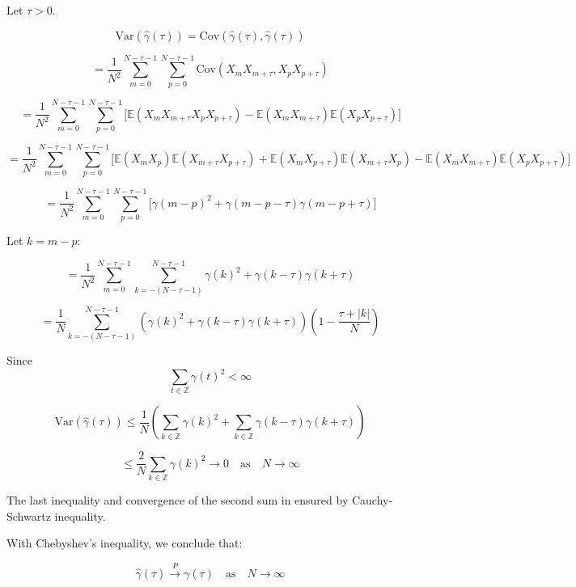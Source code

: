 \documentclass[11pt]{article}
\begin{document}
\begin{solution}

Let $\tau > 0$.

\[
\text{Var}(\hat{\gamma}(\tau)) = \text{Cov}(\hat{\gamma}(\tau), \hat{\gamma}(\tau))
\]

\[
= \frac{1}{N^2} \sum_{m=0}^{N-\tau-1} \sum_{p=0}^{N-\tau-1} \text{Cov}(X_m X_{m+\tau}, X_p X_{p+\tau})
\]

\[
= \frac{1}{N^2} \sum_{m=0}^{N-\tau-1} \sum_{p=0}^{N-\tau-1} \big[ \mathbb{E}(X_m X_{m+\tau} X_p X_{p+\tau}) - \mathbb{E}(X_m X_{m+\tau}) \mathbb{E}(X_p X_{p+\tau}) \big]
\]

\[
= \frac{1}{N^2} \sum_{m=0}^{N-\tau-1} \sum_{p=0}^{N-\tau-1} \big[ \mathbb{E}(X_m X_p) \mathbb{E}(X_{m+\tau} X_{p+\tau}) + \mathbb{E}(X_m X_{p+\tau}) \mathbb{E}(X_{m+\tau} X_p) - \mathbb{E}(X_m X_{m+\tau}) \mathbb{E}(X_p X_{p+\tau}) \big]
\]

\[
= \frac{1}{N^2} \sum_{m=0}^{N-\tau-1} \sum_{p=0}^{N-\tau-1} \big[ \gamma(m-p)^2 + \gamma(m-p-\tau)\gamma(m-p+\tau) \big]
\]

Let $k = m - p$:

\[
= \frac{1}{N^2} \sum_{m=0}^{N-\tau-1} \sum_{k=-(N-\tau-1)}^{N-\tau-1} \gamma(k)^2 + \gamma(k-\tau)\gamma(k+\tau)
\]

\[
= \frac{1}{N} \sum_{k=-(N-\tau-1)}^{N-\tau-1} \left( \gamma(k)^2 + \gamma(k-\tau) \gamma(k+\tau) \right) \left( 1 - \frac{\tau + |k|}{N} \right)
\]

Since 
\[
\sum_{t \in \mathbb{Z}} \gamma(t)^2 < \infty
\]

\[
\text{Var}(\hat{\gamma}(\tau)) \leq \frac{1}{N} \left( \sum_{k \in \mathbb{Z}} \gamma(k)^2 + \sum_{k \in \mathbb{Z}} \gamma(k - \tau) \gamma(k + \tau) \right)
\]

\[
\leq \frac{2}{N} \sum_{k \in \mathbb{Z}} \gamma(k)^2 \rightarrow 0 \quad \text{as} \quad N \rightarrow \infty
\]

The last inequality and convergence of the second sum in ensured by Cauchy-Schwartz inequality.

With Chebyshev's inequality, we conclude that:

\[
\hat{\gamma}(\tau) \xrightarrow{P} \gamma(\tau) \quad \text{as} \quad N \rightarrow \infty
\]
    
\end{solution}
\end{document}
